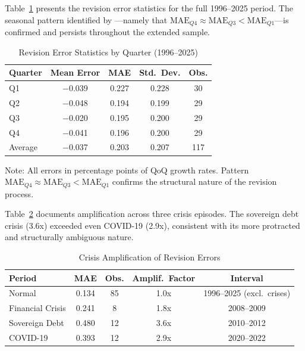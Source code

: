 \documentclass[12pt,a4paper]{article}
\theoremstyle{remark}
\begin{document}
Table~\ref{tab:revision_errors} presents the revision error statistics for the full
1996--2025 period. The seasonal pattern identified by \citet{pavia2018}---namely that
$\text{MAE}_{Q4} \approx \text{MAE}_{Q3} < \text{MAE}_{Q1}$---is confirmed and
persists throughout the extended sample.

\begin{table}[t]
\centering
\begin{threeparttable}
\caption{Revision Error Statistics by Quarter (1996--2025)}
\label{tab:revision_errors}
\begin{tabular}{lcccc}
\toprule
Quarter & Mean Error & MAE & Std.\ Dev. & Obs. \\
\midrule
Q1 & $-$0.039 & 0.227 & 0.228 & 30 \\
Q2 & $-$0.048 & 0.194 & 0.199 & 29 \\
Q3 & $-$0.020 & 0.195 & 0.200 & 29 \\
Q4 & $-$0.041 & 0.196 & 0.200 & 29 \\
\midrule
Average & $-$0.037 & 0.203 & 0.207 & 117 \\
\bottomrule
\end{tabular}
\begin{tablenotes}
  \small \item Note: All errors in percentage points of QoQ growth rates.
  Pattern $\text{MAE}_{Q4} \approx \text{MAE}_{Q3} < \text{MAE}_{Q1}$ confirms
  the structural nature of the revision process.
\end{tablenotes}
\end{threeparttable}
\end{table}


Table~\ref{tab:crisis_amplification} documents amplification across three crisis
episodes. The sovereign debt crisis (3.6x) exceeded even COVID-19 (2.9x), consistent
with its more protracted and structurally ambiguous nature.

\begin{table}[t]
\centering
\caption{Crisis Amplification of Revision Errors}
\label{tab:crisis_amplification}
\begin{tabular}{lcccc}
\toprule
Period & MAE & Obs. & Amplif.\ Factor & Interval \\
\midrule
Normal & 0.134 & 85 & 1.0x & 1996--2025 (excl.\ crises) \\
Financial Crisis & 0.241 & 8 & 1.8x & 2008--2009 \\
Sovereign Debt & 0.480 & 12 & 3.6x & 2010--2012 \\
COVID-19 & 0.393 & 12 & 2.9x & 2020--2022 \\
\bottomrule
\end{tabular}
\end{table}
\end{document}
